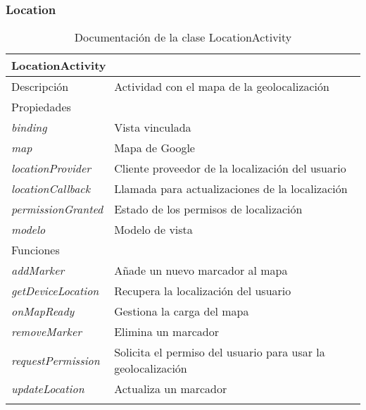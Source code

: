 \newpage
\subsubsection{Location}

\begin{longtable}{|p{} p{}|}
    \hline
    \multicolumn{2}{|l|}{\textbf{LocationActivity}} \\ \hline \hline
    Descripción      & Actividad con el mapa de la geolocalización \\ \hline
    \multicolumn{2}{|l|}{Propiedades} \\
    \emph{binding}  & Vista vinculada  \\
    \emph{map}  & Mapa de Google  \\
    \emph{locationProvider}  & Cliente proveedor de la localización del usuario  \\
    \emph{locationCallback}  & Llamada para actualizaciones de la localización \\
    \emph{permissionGranted}  & Estado de los permisos de localización \\
    \emph{modelo}  & Modelo de vista  \\ \hline
    \multicolumn{2}{|l|}{Funciones} \\
    \emph{addMarker}  & Añade un nuevo marcador al mapa  \\
    \emph{getDeviceLocation}  & Recupera la localización del usuario \\ 
    \emph{onMapReady}  & Gestiona la carga del mapa  \\
    \emph{removeMarker}  & Elimina un marcador \\
    \emph{requestPermission}  & Solicita el permiso del usuario para usar la geolocalización  \\
    \emph{updateLocation}  & Actualiza un marcador  \\  \hline
    \caption{Documentación de la clase LocationActivity}
    \label{dis:app:location_activity}
\end{longtable}

